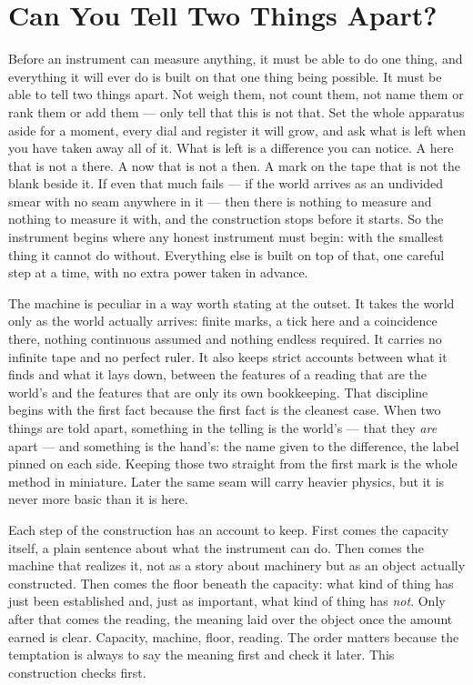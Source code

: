 \chapter{Can You Tell Two Things Apart?}

Before an instrument can measure anything, it must be able to do one thing, and everything it will ever do is
built on that one thing being possible. It must be able to tell two things apart. Not weigh them, not count
them, not name them or rank them or add them --- only tell that this is not that. Set the whole apparatus aside
for a moment, every dial and register it will grow, and ask what is left when you have taken away all of it.
What is left is a difference you can notice. A here that is not a there. A now that is not a then. A mark on the
tape that is not the blank beside it. If even that much fails --- if the world arrives as an undivided smear
with no seam anywhere in it --- then there is nothing to measure and nothing to measure it with, and the
construction stops before it starts. So the instrument begins where any honest instrument must begin: with the
smallest thing it cannot do without. Everything else is built on top of that, one careful step at a time, with no
extra power taken in advance.

The machine is peculiar in a way worth stating at the outset. It takes the world only as the world actually
arrives: finite marks, a tick here and a coincidence there, nothing continuous assumed and nothing endless
required. It carries no infinite tape and no perfect ruler. It also keeps strict accounts between what it finds
and what it lays down, between the features of a reading that are the world's and the features that are only its
own bookkeeping. That discipline begins with the first fact because the first fact is the cleanest case. When two
things are told apart, something in the telling is the world's --- that they \emph{are} apart --- and something is
the hand's: the name given to the difference, the label pinned on each side. Keeping those two straight from the
first mark is the whole method in miniature. Later the same seam will carry heavier physics, but it is never more
basic than it is here.

Each step of the construction has an account to keep. First comes the capacity itself, a plain sentence about what
the instrument can do. Then comes the machine that realizes it, not as a story about machinery but as an object
actually constructed. Then comes the floor beneath the capacity: what kind of thing has just been established and,
just as important, what kind of thing has \emph{not}. Only after that comes the reading, the meaning laid over the
object once the amount earned is clear. Capacity, machine, floor, reading. The order matters because the
temptation is always to say the meaning first and check it later. This construction checks first.

